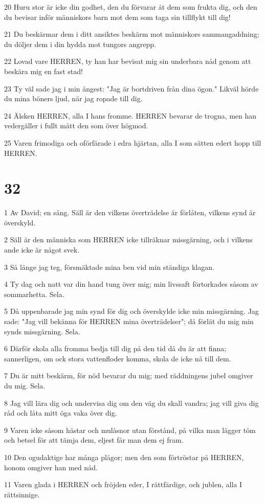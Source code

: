 \par 20 Huru stor är icke din godhet, den du förvarar åt dem som frukta dig, och den du bevisar inför människors barn mot dem som taga sin tillflykt till dig!
\par 21 Du beskärmar dem i ditt ansiktes beskärm mot människors sammangaddning; du döljer dem i din hydda mot tungors angrepp.
\par 22 Lovad vare HERREN, ty han har bevisat mig sin underbara nåd genom att beskära mig en fast stad!
\par 23 Ty väl sade jag i min ångest: "Jag är bortdriven från dina ögon." Likväl hörde du mina böners ljud, när jag ropade till dig.
\par 24 Älsken HERREN, alla I hans fromme. HERREN bevarar de trogna, men han vedergäller i fullt mått den som över högmod.
\par 25 Varen frimodiga och oförfärade i edra hjärtan, alla I som sätten edert hopp till HERREN.

\chapter{32}

\par 1 Av David; en sång. Säll är den vilkens överträdelse är förlåten, vilkens synd är överskyld.
\par 2 Säll är den människa som HERREN icke tillräknar missgärning, och i vilkens ande icke är något svek.
\par 3 Så länge jag teg, försmäktade mina ben vid min ständiga klagan.
\par 4 Ty dag och natt var din hand tung över mig; min livssaft förtorkades såsom av sommarhetta. Sela.
\par 5 Då uppenbarade jag min synd för dig och överskylde icke min missgärning. Jag sade: "Jag vill bekänna för HERREN mina överträdelser"; då förlät du mig min synds missgärning. Sela.
\par 6 Därför skola alla fromma bedja till dig på den tid då du är att finna; sannerligen, om ock stora vattenfloder komma, skola de icke nå till dem.
\par 7 Du är mitt beskärm, för nöd bevarar du mig; med räddningens jubel omgiver du mig. Sela.
\par 8 Jag vill lära dig och undervisa dig om den väg du skall vandra; jag vill giva dig råd och låta mitt öga vaka över dig.
\par 9 Varen icke såsom hästar och mulåsnor utan förstånd, på vilka man lägger töm och betsel för att tämja dem, eljest får man dem ej fram.
\par 10 Den ogudaktige har många plågor; men den som förtröstar på HERREN, honom omgiver han med nåd.
\par 11 Varen glada i HERREN och fröjden eder, I rättfärdige, och jublen, alla I rättsinnige.

